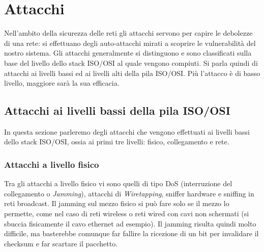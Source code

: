 \chapter{Attacchi}
Nell'ambito della sicurezza delle reti gli attacchi servono per capire le debolezze di una rete: si effettuano degli auto-attacchi mirati a scoprire le vulnerabilità del nostro sistema. Gli attacchi generalmente si distinguono e sono classificati sulla base del livello dello stack ISO/OSI al quale vengono compiuti. Si parla quindi di attacchi ai livelli bassi ed ai livelli alti della pila ISO/OSI. Più l'attacco è di basso livello, maggiore sarà la sua efficacia.

\section{Attacchi ai livelli bassi della pila ISO/OSI}
In questa sezione parleremo degli attacchi che vengono effettuati ai livelli bassi dello stack ISO/OSI, ossia ai primi tre livelli: fisico, collegamento e rete.

\subsection{Attacchi a livello fisico}
Tra gli attacchi a livello fisico vi sono quelli di tipo DoS (interruzione del collegamento o \textit{Jamming}), attacchi di \textit{Wiretapping}, sniffer hardware e sniffing in reti broadcast. Il jamming sul mezzo fisico si può fare solo se il mezzo lo permette, come nel caso di reti wireless o reti wired con cavi non schermati (si sbuccia fisicamente il cavo ethernet ad esempio). Il jamming risulta quindi molto difficile, ma basterebbe comunque far fallire la ricezione di un bit per invalidare il checksum e far scartare il pacchetto.

